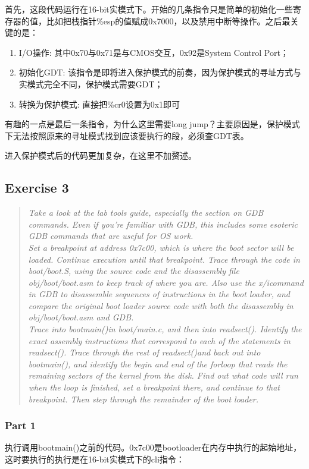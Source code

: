 首先，这段代码运行在16-bit实模式下。开始的几条指令只是简单的初始化一些寄存器的值，比如把栈指针\%esp的值赋成0x7000，以及禁用中断等操作。之后最关键的是：
\begin{enumerate}
\item I/O操作: 其中0x70与0x71是与CMOS交互，0x92是System Control Port；
\item 初始化GDT: 该指令是即将进入保护模式的前奏，因为保护模式的寻址方式与实模式完全不同，保护模式需要GDT；
\item 转换为保护模式: 直接把\%cr0设置为0x1即可
\end{enumerate}

有趣的一点是最后一条指令，为什么这里需要long jump？主要原因是，保护模式下无法按照原来的寻址模式找到应该要执行的段，必须查GDT表。

进入保护模式后的代码更加复杂，在这里不加赘述。

\subsection{Exercise 3}
\begin{quote}
\textit{Take a look at the lab tools guide, especially the section on GDB commands. Even if you're familiar with GDB, this includes some esoteric GDB commands that are useful for OS work.\\
Set a breakpoint at address 0x7c00, which is where the boot sector will be loaded. Continue execution until that breakpoint. Trace through the code in boot/boot.S, using the source code and the disassembly file obj/boot/boot.asm to keep track of where you are. Also use the x/icommand in GDB to disassemble sequences of instructions in the boot loader, and compare the original boot loader source code with both the disassembly in obj/boot/boot.asm and GDB.\\
Trace into bootmain()in boot/main.c, and then into readsect(). Identify the exact assembly instructions that correspond to each of the statements in readsect(). Trace through the rest of readsect()and back out into bootmain(), and identify the begin and end of the forloop that reads the remaining sectors of the kernel from the disk. Find out what code will run when the loop is finished, set a breakpoint there, and continue to that breakpoint. Then step through the remainder of the boot loader.}
\end{quote}

\subsubsection{Part 1}
执行调用bootmain()之前的代码。0x7c00是bootloader在内存中执行的起始地址，这时要执行的执行是在16-bit实模式下的cli指令：\\

